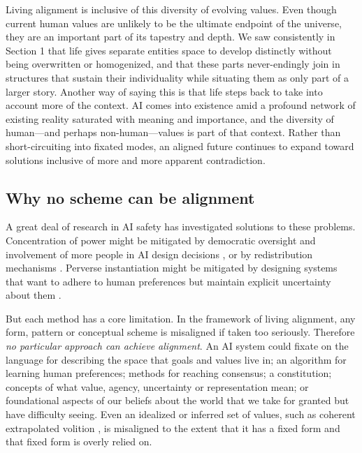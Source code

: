 \documentclass[11pt]{article}
\begin{document}
Living alignment is inclusive of this diversity of evolving values. Even though current human values are unlikely to be the ultimate endpoint of the universe, they are an important part of its tapestry and depth. We saw consistently in Section 1 that life gives separate entities space to develop distinctly without being overwritten or homogenized, and that these parts never-endingly join in structures that sustain their individuality while situating them as only part of a larger story. Another way of saying this is that life steps back to take into account more of the context. AI comes into existence amid a profound network of existing reality saturated with meaning and importance, and the diversity of human---and perhaps non-human---values is part of that context. Rather than short-circuiting into fixated modes, an aligned future continues to expand toward solutions inclusive of more and more apparent contradiction.


\subsection{Why no scheme can be alignment}

A great deal of research in AI safety has investigated solutions to these problems. Concentration of power might be mitigated by democratic oversight and involvement of more people in AI design decisions \citep{birhane2022power}, or by redistribution mechanisms \citep{okeefe2020windfall}. Perverse instantiation might be mitigated by designing systems that want to adhere to human preferences but maintain explicit uncertainty about them \citep{russell2019human, hadfieldmenell2017off, shah2020benefits}.

But each method has a core limitation. In the framework of living alignment, any form, pattern or conceptual scheme is misaligned if taken too seriously. Therefore \textit{no particular approach can achieve alignment}. An AI system could fixate on the language for describing the space that goals and values live in; an algorithm for learning human preferences; methods for reaching consensus; a constitution; concepts of what value, agency, uncertainty or representation mean; or foundational aspects of our beliefs about the world that we take for granted but have difficulty seeing. Even an idealized or inferred set of values, such as coherent extrapolated volition \citep{yudkowsky2004coherent}, is misaligned to the extent that it has a fixed form and that fixed form is overly relied on.
\end{document}
